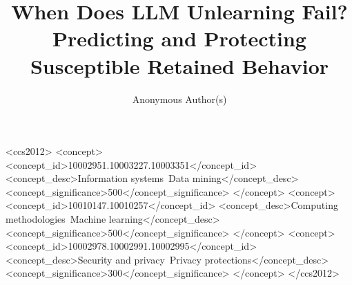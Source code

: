 \documentclass[sigconf,anonymous,review]{acmart}
\begin{document}
\title{When Does LLM Unlearning Fail? Predicting and Protecting Susceptible Retained Behavior}

\author{Anonymous Author(s)}

\renewcommand{\shortauthors}{Anon.}



\begin{CCSXML}
<ccs2012>
 <concept>
  <concept_id>10002951.10003227.10003351</concept_id>
  <concept_desc>Information systems~Data mining</concept_desc>
  <concept_significance>500</concept_significance>
 </concept>
 <concept>
  <concept_id>10010147.10010257</concept_id>
  <concept_desc>Computing methodologies~Machine learning</concept_desc>
  <concept_significance>500</concept_significance>
 </concept>
 <concept>
  <concept_id>10002978.10002991.10002995</concept_id>
  <concept_desc>Security and privacy~Privacy protections</concept_desc>
  <concept_significance>300</concept_significance>
 </concept>
</ccs2012>
\end{CCSXML}



\maketitle














\appendix

\end{document}
